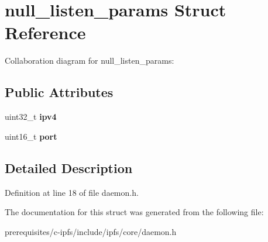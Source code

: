 \hypertarget{structnull__listen__params}{}\section{null\+\_\+listen\+\_\+params Struct Reference}
\label{structnull__listen__params}


Collaboration diagram for null\+\_\+listen\+\_\+params\+:
\subsection*{Public Attributes}
\begin{DoxyCompactItemize}
\item 
\mbox{\label{structnull__listen__params_ae114fe7d58a0aaae566bfb147224dcec}} 
uint32\+\_\+t {\bfseries ipv4}
\item 
\mbox{\label{structnull__listen__params_a0db214471215e47ea3ca488356fe351c}} 
uint16\+\_\+t {\bfseries port}
\end{DoxyCompactItemize}


\subsection{Detailed Description}


Definition at line 18 of file daemon.\+h.



The documentation for this struct was generated from the following file\+:\begin{DoxyCompactItemize}
\item 
prerequisites/c-\/ipfs/include/ipfs/core/daemon.\+h\end{DoxyCompactItemize}
